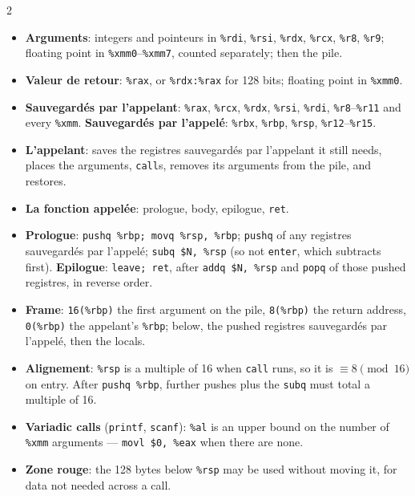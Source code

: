 \begin{multicols}{2}
\begin{itemize}[nosep, leftmargin=10pt]
  \item \textbf{Arguments}: integers and pointeurs in \texttt{\%rdi}, \texttt{\%rsi},
    \texttt{\%rdx}, \texttt{\%rcx}, \texttt{\%r8}, \texttt{\%r9}; floating point in
    \texttt{\%xmm0}--\texttt{\%xmm7}, counted separately; then the pile.
  \item \textbf{Valeur de retour}: \texttt{\%rax}, or \texttt{\%rdx:\%rax} for 128 bits;
    floating point in \texttt{\%xmm0}.
  \item \textbf{Sauvegardés par l'appelant}:
    \texttt{\%rax}, \texttt{\%rcx}, \texttt{\%rdx}, \texttt{\%rsi}, \texttt{\%rdi},
    \texttt{\%r8}--\texttt{\%r11} and every \texttt{\%xmm}. \textbf{Sauvegardés par l'appelé}: \texttt{\%rbx}, \texttt{\%rbp}, \texttt{\%rsp},
    \texttt{\%r12}--\texttt{\%r15}.
  \item \textbf{L'appelant}: saves the registres sauvegardés par l'appelant
    it still needs, places the arguments, \texttt{call}s, removes its arguments
    from the pile, and restores.
  \item \textbf{La fonction appelée}: prologue, body, epilogue,
    \texttt{ret}.
  \item \textbf{Prologue}: \texttt{pushq~\%rbp; movq~\%rsp,~\%rbp}; \texttt{pushq} of any registres sauvegardés par l'appelé; \texttt{subq~\$N,~\%rsp} (so not \texttt{enter}, which subtracts first). \textbf{Epilogue}: \texttt{leave; ret}, after
    \texttt{addq~\$N,~\%rsp} and \texttt{popq} of those pushed registres, in reverse order.
  \item \textbf{Frame}: \texttt{16(\%rbp)} the first argument on the pile,
    \texttt{8(\%rbp)} the return address, \texttt{0(\%rbp)} the appelant's
    \texttt{\%rbp}; below, the pushed registres sauvegardés par l'appelé, then the locals.
  \item \textbf{Alignement}: \texttt{\%rsp} is a multiple of 16 when \texttt{call}
    runs, so it is \mbox{$\equiv 8 \pmod{16}$} on entry. After \texttt{pushq \%rbp},
    further pushes plus the \texttt{subq} must total a multiple of 16.
  \item \textbf{Variadic calls} (\texttt{printf}, \texttt{scanf}): \texttt{\%al}
    is an upper bound on the number of \texttt{\%xmm} arguments ---
    \mbox{\texttt{movl \$0, \%eax}} when there are none.
  \item \textbf{Zone rouge}: the 128 bytes below \texttt{\%rsp} may be used without
    moving it, for data not needed across a call.

\end{itemize}
\end{multicols}
